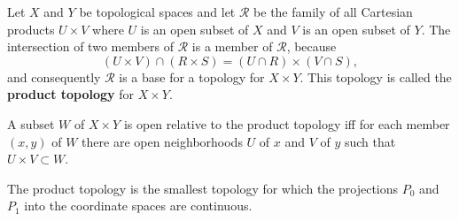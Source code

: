 Let $X$ and $Y$ be topological spaces and let $\mathscr{R}$ be the family of all Cartesian products $U \times V$ where $U$ is an open subset of $X$ and $V$ is an open subset of $Y$. The intersection of two members of $\mathscr{R}$ is a member of $\mathscr{R}$, because
$$(U \times V) \cap (R \times S) = (U \cap R) \times (V \cap S),$$
and consequently $\mathscr{R}$ is a base for a topology for $X \times Y$. This topology is called the \textbf{product topology} for $X \times Y$.

A subset $W$ of $X \times Y$ is open relative to the product topology iff for each member $(x,y)$ of $W$ there are open neighborhoods $U$ of $x$ and $V$ of $y$ such that $U \times V \subset W$.

The product topology is the smallest topology for which the projections $P_0$ and $P_1$ into the coordinate spaces are continuous.
